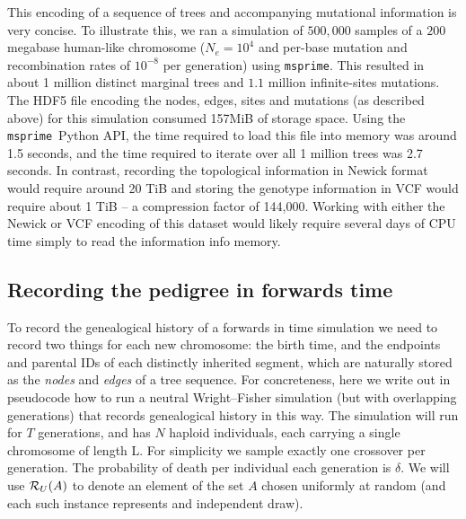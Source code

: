 \documentclass{article}
\newcommand{\msprime}{\texttt{msprime}}
\begin{document}
This encoding of a sequence of trees and accompanying mutational information is
very concise. To illustrate this, we ran a simulation of $500,000$ samples of a
$200$ megabase human-like chromosome ($N_e=10^4$ and per-base mutation and
recombination rates of $10^{-8}$ per generation) using \msprime. This resulted
in about 1 million distinct marginal trees and $1.1$ million infinite-sites
mutations. The HDF5 file encoding the nodes, edges, sites and mutations (as
described above) for this simulation consumed 157MiB of storage space. Using
the \msprime\ Python API, the time required to load this file into memory was
around 1.5 seconds, and the time required to iterate over all 1 million trees
was 2.7 seconds. In contrast, recording the topological information in Newick
format would require around 20 TiB and storing the genotype information
in VCF would require about 1 TiB --
a compression factor of 144,000.
Working with either the Newick or VCF encoding
of this dataset would likely require several
days of CPU time simply to read the information info memory.


\subsection*{Recording the pedigree in forwards time}

To record the genealogical history of a forwards in time simulation
we need to record two things for each new chromosome:
the birth time, and the endpoints and parental IDs of each distinctly inherited segment,
which are naturally stored as the \emph{nodes} and \emph{edges} of a tree sequence.
For concreteness, here we write out in pseudocode how to run a neutral Wright--Fisher simulation
(but with overlapping generations) that records genealogical history in this way.
The simulation will run for $T$ generations,
and has $N$ haploid individuals, each carrying a single chromosome of length L.
For simplicity we sample exactly one crossover per generation.
The probability of death per individual each generation is $\delta$.
We will use
$\mathcal{R}_U(A)$ to denote an element of the set $A$ chosen uniformly at random 
(and each such instance represents and independent draw).
\end{document}
